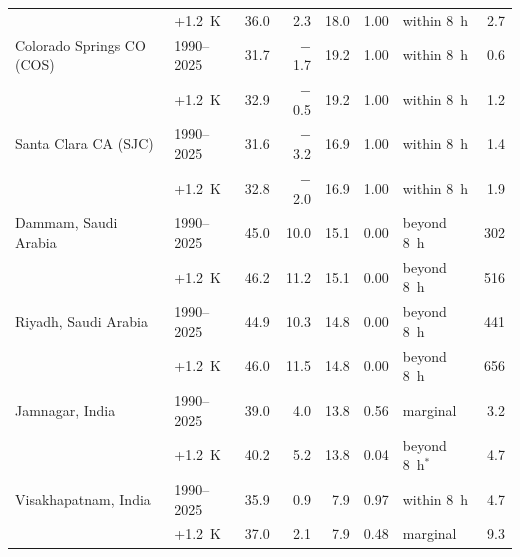 \begin{table}[htbp]
\begin{tabular}{@{}llrrrrlr@{}}
 & +1.2~K & 36.0 & 2.3 & 18.0 & 1.00 & within 8~h & 2.7 \\
Colorado Springs CO (COS) & 1990--2025 & 31.7 & $-$1.7 & 19.2 & 1.00 & within 8~h & 0.6 \\
 & +1.2~K & 32.9 & $-$0.5 & 19.2 & 1.00 & within 8~h & 1.2 \\
Santa Clara CA (SJC) & 1990--2025 & 31.6 & $-$3.2 & 16.9 & 1.00 & within 8~h & 1.4 \\
 & +1.2~K & 32.8 & $-$2.0 & 16.9 & 1.00 & within 8~h & 1.9 \\
Dammam, Saudi Arabia & 1990--2025 & 45.0 & 10.0 & 15.1 & 0.00 & beyond 8~h & 302 \\
 & +1.2~K & 46.2 & 11.2 & 15.1 & 0.00 & beyond 8~h & 516 \\
Riyadh, Saudi Arabia & 1990--2025 & 44.9 & 10.3 & 14.8 & 0.00 & beyond 8~h & 441 \\
 & +1.2~K & 46.0 & 11.5 & 14.8 & 0.00 & beyond 8~h & 656 \\
Jamnagar, India & 1990--2025 & 39.0 & 4.0 & 13.8 & 0.56 & marginal & 3.2 \\
 & +1.2~K & 40.2 & 5.2 & 13.8 & 0.04 & beyond 8~h$^{\ast}$ & 4.7 \\
Visakhapatnam, India & 1990--2025 & 35.9 & 0.9 & 7.9 & 0.97 & within 8~h & 4.7 \\
 & +1.2~K & 37.0 & 2.1 & 7.9 & 0.48 & marginal & 9.3 \\
\bottomrule
\end{tabular}
\end{table}
